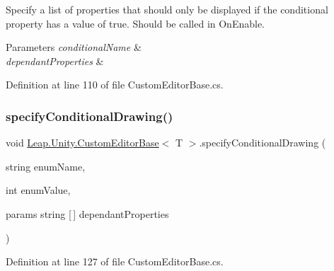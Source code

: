 Specify a list of properties that should only be displayed if the conditional property has a value of true. Should be called in On\+Enable. 


\begin{DoxyParams}{Parameters}
{\em conditional\+Name} & \\
\hline
{\em dependant\+Properties} & \\
\hline
\end{DoxyParams}


Definition at line 110 of file Custom\+Editor\+Base.\+cs.

\mbox{\label{class_leap_1_1_unity_1_1_custom_editor_base_af83f5e330901a815e05aa3a825128ab9}} 
\subsubsection{\texorpdfstring{specifyConditionalDrawing()}{specifyConditionalDrawing()}\hspace{0.1cm}{\footnotesize\ttfamily [2/3]}}
{\footnotesize\ttfamily void \mbox{\hyperlink{class_leap_1_1_unity_1_1_custom_editor_base}{Leap.\+Unity.\+Custom\+Editor\+Base}}$<$ T $>$.specify\+Conditional\+Drawing (\begin{DoxyParamCaption}\item[{string}]{enum\+Name,  }\item[{int}]{enum\+Value,  }\item[{params string \mbox{[}$\,$\mbox{]}}]{dependant\+Properties }\end{DoxyParamCaption})\hspace{0.3cm}{\ttfamily [protected]}}



Definition at line 127 of file Custom\+Editor\+Base.\+cs.

\mbox{\label{class_leap_1_1_unity_1_1_custom_editor_base_a397cd9e96452b55644ff0b4dc4c4db9e}} 
